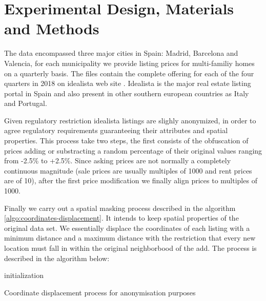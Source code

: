 \documentclass[times,final]{elsarticle}
\begin{document}
\section*{Experimental Design, Materials and Methods}

The data encompassed three major cities in Spain: Madrid, Barcelona and Valencia, for each municipality we provide listing prices for multi-familiy homes on a quarterly basis. The files contain the complete offering for each of the four quarters in 2018 on idealista web site \cite{idealista}. Idealista is the major real estate listing portal in Spain and also present in other southern european countries as Italy and Portugal.

Given regulatory restriction idealista listings are slighly anonymized, in order to agree regulatory requirements guaranteeing their attributes and spatial properties. This process take two steps, the first consists of the obfuscation of prices adding or substracting a random percentage of their original values ranging from -2.5\% to +2.5\%. Since asking prices are not normally a completely continuous magnitude (sale prices are usually multiples of 1000 and rent prices are of 10), after the first price modification we finally align prices to multiples of 1000.


Finally we carry out a spatial masking process described in the algorithm \ref{algo:coordinates-displacement}. It intends to keep spatial properties of the original data set. We essentially displace the coordinates of each listing with a minimum distance and a maximum distance with the restriction that every new location must fall in within the original neighborbood of the add. The process is described in the algorithm below:

\begin{algorithm}[H]
 initialization\;
 \caption{Coordinate displacement process for anonymisation purposes}
 \label{algo:coordinates-displacement}
\end{algorithm}
\end{document}
